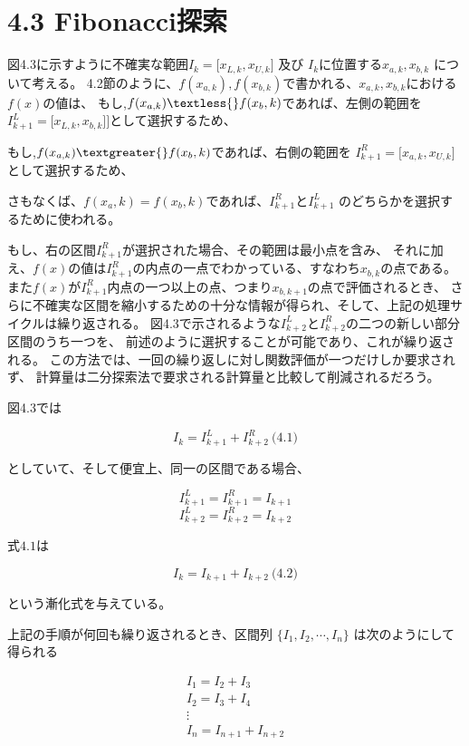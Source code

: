 \section*{4.3 Fibonacci探索}
図4.3に示すように不確実な範囲$I_k = \lbrack x_{L,k},
x_{U,k} \rbrack$ 及び $I_k$に位置する$x_{a,k},
x_{b,k}$ について考える。 4.2節のように、$f(x_{a,k}),
f(x_{b,k})$で書かれる、$x_{a,k},
x_{b,k}$における$f(x)$の値は、 もし,$f(x_{a,k}) \textless{}
f(x_b,k)$であれば、左側の範囲を $I_{k+1}^{L} =
\lbrack x_{L,k}, x_{b,k}
\rbrack\rbrack$として選択するため、

もし,$f(x_{a,k}) \textgreater{} f(x_b,k)$であれば、右側の範囲を
$I_{k+1}^{R} = \lbrack x_{a,k}, x_{U,k}
\rbrack$ として選択するため、

さもなくば、$f(x_a, k) = f(x_b,
k)$であれば、$I_{k+1}^R$と$I_{k+1}^L$
のどちらかを選択するために使われる。

もし、右の区間$I^R_{k+1}$が選択された場合、その範囲は最小点を含み、
それに加え、$f(x)$の値は$I^R_{k+1}$の内点の一点でわかっている、すなわち$x_{b,k}$の点である。
また$f(x)$が$I^R_{k+1}$内点の一つ以上の点、つまり$x_{b,
k+1}$の点で評価されるとき、
さらに不確実な区間を縮小するための十分な情報が得られ、そして、上記の処理サイクルは繰り返される。
図4.3で示されるような$I_{k+2}^L$と$I_{k+2}^R$の二つの新しい部分区間のうち一つを、
前述のように選択することが可能であり、これが繰り返される。
この方法では、一回の繰り返しに対し関数評価が一つだけしか要求されず、
計算量は二分探索法で要求される計算量と比較して削減されるだろう。

図4.3では

$$I_k = I_{k+1}^L + I_{k+2}^R
\ \text{(4.1)}$$

としていて、そして便宜上、同一の区間である場合、

$$I_{k+1}^L = I_{k+1}^R = I_{k+1}$$
$$I_{k+2}^L = I_{k+2}^R = I_{k+2}$$

式$4.1$は

$$I_k = I_{k+1} + I_{k+2} \ \text{(4.2)}$$

という漸化式を与えている。

上記の手順が何回も繰り返されるとき、区間列 $\lbrace
I_1, I_2, \cdots , I_n \rbrace$
は次のようにして得られる

$$ \begin{array}{c} I_1 = I_2 + I_3
\\ I_2 = I_3 + I_4
\\ \vdots
\\ I_n = I_{n+1} + I_{n+2}
\\ \end{array} $$

